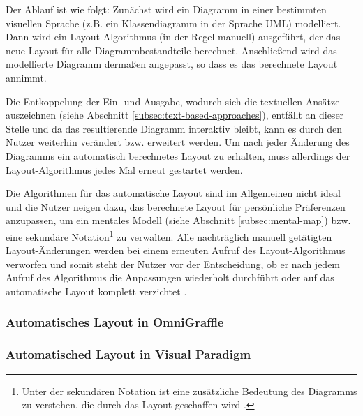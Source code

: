 Der Ablauf ist wie folgt: Zunächst wird ein Diagramm in einer bestimmten visuellen Sprache (z.B. ein Klassendiagramm in der Sprache UML) modelliert. Dann wird ein Layout-Algorithmus (in der Regel manuell) ausgeführt, der das neue Layout für alle Diagrammbestandteile berechnet. Anschließend wird das modellierte Diagramm dermaßen angepasst, so dass es das berechnete Layout annimmt.

Die Entkoppelung der Ein- und Ausgabe, wodurch sich die textuellen Ansätze auszeichnen (siehe Abschnitt \ref{subsec:text-based-approaches}), entfällt an dieser Stelle und da das resultierende Diagramm interaktiv bleibt, kann es durch den Nutzer weiterhin verändert bzw. erweitert werden. Um nach jeder Änderung des Diagramms ein automatisch berechnetes Layout zu erhalten, muss allerdings der Layout-Algorithmus jedes Mal erneut gestartet werden.

Die Algorithmen für das automatische Layout sind im Allgemeinen nicht ideal und die Nutzer neigen dazu, das berechnete Layout für persönliche Präferenzen anzupassen, um ein mentales Modell (siehe Abschnitt \ref{subsec:mental-map}) bzw. eine sekundäre Notation\footnote{Unter der sekundären Notation ist eine zusätzliche Bedeutung des Diagramms zu verstehen, die durch das Layout geschaffen wird \cite{SeyboldGlinz03An-Effective}.} zu verwalten. Alle nachträglich manuell getätigten Layout-Änderungen werden bei einem erneuten Aufruf des Layout-Algorithmus verworfen und somit steht der Nutzer vor der Entscheidung, ob er nach jedem Aufruf des Algorithmus die Anpassungen wiederholt durchführt oder auf das automatische Layout komplett verzichtet \cite[S.119ff]{Eiglsperger04Automatic}.

\subsubsection{Automatisches Layout in OmniGraffle}
\label{subsubsec:omnigraffle-auto-layout}




\subsubsection{Automatisched Layout in Visual Paradigm}

